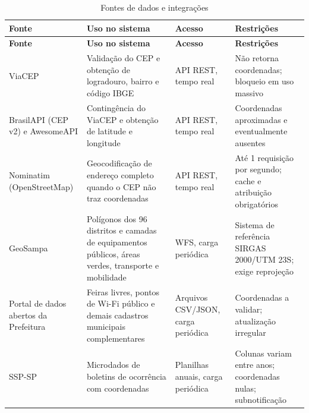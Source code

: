 \begin{longtable}{L{3.1cm}L{4.3cm}L{2.3cm}L{4.4cm}}
	\caption{Fontes de dados e integrações}
	\label{qua:fontes}                                                                                                                                                                                                                                \\
	\toprule
	\textbf{Fonte}                        & \textbf{Uso no sistema}                                                                              & \textbf{Acesso}                    & \textbf{Restrições}                                           \\
	\midrule
	\endfirsthead
	\toprule
	\textbf{Fonte}                        & \textbf{Uso no sistema}                                                                              & \textbf{Acesso}                    & \textbf{Restrições}                                           \\
	\midrule
	\endhead
	\bottomrule
	\endfoot
	ViaCEP                                & Validação do CEP e obtenção de logradouro, bairro e código IBGE                                      & API REST, tempo real               & Não retorna coordenadas; bloqueio em uso massivo              \\
	BrasilAPI (CEP v2) e AwesomeAPI       & Contingência do ViaCEP e obtenção de latitude e longitude                                            & API REST, tempo real               & Coordenadas aproximadas e eventualmente ausentes              \\
	Nominatim (OpenStreetMap)             & Geocodificação de endereço completo quando o CEP não traz coordenadas                                & API REST, tempo real               & Até 1 requisição por segundo; cache e atribuição obrigatórios \\
	GeoSampa                              & Polígonos dos 96 distritos e camadas de equipamentos públicos, áreas verdes, transporte e mobilidade & WFS, carga periódica               & Sistema de referência SIRGAS 2000/UTM 23S; exige reprojeção   \\
	Portal de dados abertos da Prefeitura & Feiras livres, pontos de Wi-Fi público e demais cadastros municipais complementares                  & Arquivos CSV/JSON, carga periódica & Coordenadas a validar; atualização irregular                  \\
	SSP-SP                                & Microdados de boletins de ocorrência com coordenadas                                                 & Planilhas anuais, carga periódica  & Colunas variam entre anos; coordenadas nulas; subnotificação  \\

\end{longtable}

